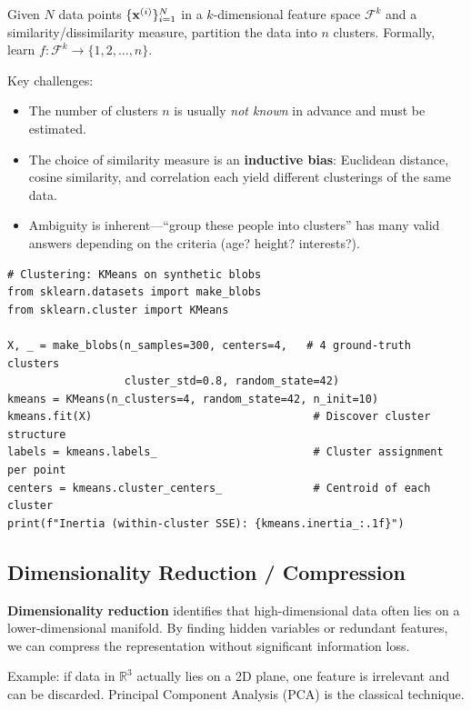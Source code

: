 \begin{definition}[Clustering]
Given $N$ data points $\{\mathbf{x}^{(i)}\}_{i=1}^N$ in a $k$-dimensional feature space $\mathcal{F}^k$ and a similarity/dissimilarity measure, partition the data into $n$ clusters. Formally, learn $f: \mathcal{F}^k \to \{1, 2, \dots, n\}$.
\end{definition}

Key challenges:
\begin{itemize}
    \item The number of clusters $n$ is usually \emph{not known} in advance and must be estimated.
    \item The choice of similarity measure is an \textbf{inductive bias}: Euclidean distance, cosine similarity, and correlation each yield different clusterings of the same data.
    \item Ambiguity is inherent---``group these people into clusters'' has many valid answers depending on the criteria (age? height? interests?).
\end{itemize}

\begin{lstlisting}[style=pythonstyle]
# Clustering: KMeans on synthetic blobs
from sklearn.datasets import make_blobs
from sklearn.cluster import KMeans

X, _ = make_blobs(n_samples=300, centers=4,   # 4 ground-truth clusters
                  cluster_std=0.8, random_state=42)
kmeans = KMeans(n_clusters=4, random_state=42, n_init=10)
kmeans.fit(X)                                  # Discover cluster structure
labels = kmeans.labels_                        # Cluster assignment per point
centers = kmeans.cluster_centers_              # Centroid of each cluster
print(f"Inertia (within-cluster SSE): {kmeans.inertia_:.1f}")
\end{lstlisting}

\subsection*{Dimensionality Reduction / Compression}

\textbf{Dimensionality reduction} identifies that high-dimensional data often lies on a lower-dimensional manifold. By finding hidden variables or redundant features, we can compress the representation without significant information loss.

Example: if data in $\mathbb{R}^3$ actually lies on a 2D plane, one feature is irrelevant and can be discarded. Principal Component Analysis (PCA) is the classical technique.

